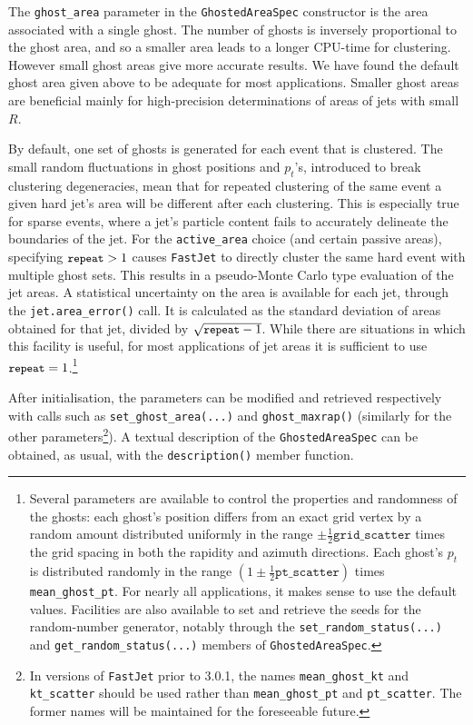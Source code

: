 \documentclass[12pt,a4]{article}
\newcommand{\fastjet}{\texttt{FastJet}\xspace}
\newcommand{\ttt}[1]{{\small\texttt{#1}}}
\begin{document}
The \ttt{ghost\_area} parameter in the \ttt{GhostedAreaSpec}
constructor is the area associated with a single ghost. 
%
The number of ghosts is inversely proportional to the ghost area, and
so a smaller area leads to a longer CPU-time for clustering. However
small ghost areas give more accurate results. 
%
We have found the default ghost area given above to be adequate for
most applications.
%
Smaller ghost areas are beneficial mainly for high-precision
determinations of areas of jets with small $R$.

By default, one set of ghosts is generated for each event that is
clustered.
%
The small random fluctuations in ghost positions and $p_t$'s,
introduced to break clustering degeneracies, mean that for repeated
clustering of the same event a given hard jet's area will be different
after each clustering.
%
This is especially true for sparse events, where a jet's particle
content fails to accurately delineate the boundaries of the jet.
%
For the \texttt{active\_area} choice (and certain passive areas),
specifying $\ttt{repeat} > 1$ causes \fastjet to directly cluster the
same hard event with multiple ghost sets.
%
This results in a pseudo-Monte Carlo type evaluation of the jet areas.
%
A statistical uncertainty on the area is available for each jet,
through the \ttt{jet.area\_error()} call.
%
It is calculated as the standard deviation of areas obtained for that
jet, divided by $\sqrt{\ttt{repeat}-1}$.
%
While there are situations in which this facility is useful, for most
applications of jet areas it is sufficient to use
$\ttt{repeat}=1$.\footnote{%
  Several parameters are available to control the properties and
  randomness of the ghosts: each ghost's position differs from an
  exact grid vertex by a random amount distributed uniformly in the
  range $\pm \frac12 \texttt{grid\_scatter}$ times the grid spacing in
  both the rapidity and azimuth directions.
  Each ghost's $p_t$ is distributed randomly in the range $(1 \pm \frac12
  \texttt{pt\_scatter})$ times \texttt{mean\_ghost\_pt}.
  For nearly all applications, it makes sense to use the default
  values.
  Facilities are also available to set and retrieve the seeds for the
  random-number generator, notably through the
  \texttt{set\_random\_status(...)} and
  \texttt{get\_random\_status(...)} members of
  \texttt{GhostedAreaSpec}.  }



After initialisation, the parameters can be modified and retrieved
respectively with calls such as \ttt{set\_ghost\_area(...)} and
\ttt{ghost\_maxrap()} (similarly for the other
parameters\footnote{In versions of \fastjet prior to 3.0.1, the names
  \texttt{mean\_ghost\_kt} and \texttt{kt\_scatter} should be used
  rather than \texttt{mean\_ghost\_pt} and \texttt{pt\_scatter}. The
  former names will be maintained for the foreseeable future.}).
%
A textual description of the \ttt{GhostedAreaSpec} can be obtained, as
usual, with the \ttt{description()} member function.
\end{document}
